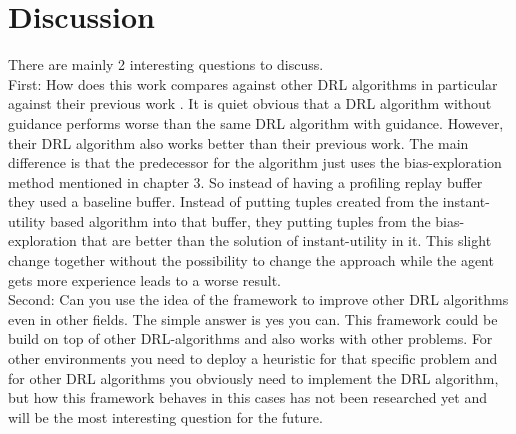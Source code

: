 \section{Discussion} %
\label{sec:relwork}
There are mainly 2 interesting questions to discuss.\\
First: How does this work compares against other DRL algorithms in particular against their previous work \cite{Guz}. It is quiet obvious that a DRL algorithm without guidance performs worse than the same DRL algorithm with guidance. However, their DRL algorithm also works better than their previous work. The main difference is that the predecessor for the algorithm just uses the bias-exploration method mentioned in chapter 3. %
So instead of having a profiling replay buffer they used a baseline buffer. Instead of putting tuples created from the instant-utility based algorithm into that buffer, they putting tuples from the bias-exploration that are better than the solution of instant-utility in it. This slight change together without the possibility to change the approach while the agent gets more experience leads to a worse result.  \\

Second: Can you use the idea of the framework to improve other DRL algorithms even in other fields.
The simple answer is yes you can. This framework could be build on top of other DRL-algorithms and also works with other problems. For other environments you need to deploy a heuristic for that specific problem and for other DRL algorithms you obviously need to implement the DRL algorithm, but how this framework behaves in this cases has not been researched yet and will be the most interesting question for the future.




 